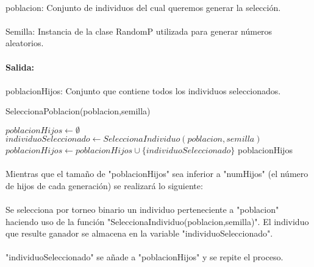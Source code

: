 	\paragraph{}poblacion: Conjunto de individuos del cual queremos generar la selección.
	
	\paragraph{}Semilla: Instancia de la clase RandomP utilizada para generar números aleatorios.
	
	\paragraph{Salida:}
	
	\paragraph{}poblacionHijos: Conjunto que contiene todos los individuos seleccionados.

	\begin{algorithm}[H]
		\caption{SeleccionaPoblacion(poblacion,semilla)}
		\begin{algorithmic}
			\STATE $poblacionHijos \leftarrow \emptyset$
			\STATE $individuoSeleccionado \leftarrow SeleccionaIndividuo(poblacion,semilla)$
			\STATE $poblacionHijos \leftarrow poblacionHijos\cup\{individuoSeleccionado\}$
			\ENDWHILE
			\RETURN poblacionHijos
		\end{algorithmic}
	\end{algorithm}

	\paragraph{}Mientras que el tamaño de "poblacionHijos" sea inferior a "numHijos" (el número de hijos de cada generación) se realizará lo siguiente:
	
	\paragraph{} Se selecciona por torneo binario un individuo perteneciente a "poblacion" haciendo uso de la función "SeleccionaIndividuo(poblacion,semilla)". El individuo que resulte ganador se almacena en la variable "individuoSeleccionado".
	
	\paragraph{}"individuoSeleccionado" se añade a "poblacionHijos" y se repite el proceso.
	
